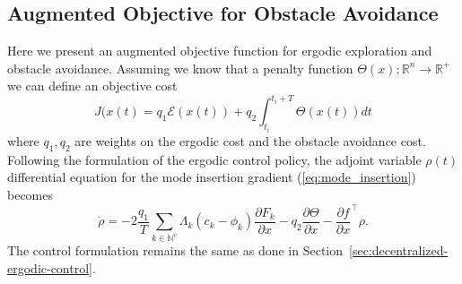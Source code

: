 \documentclass[letterpaper, 10 pt, conference]{ieeeconf}  %
\begin{document}
\subsection{Augmented Objective for Obstacle Avoidance}
\label{sec:obstacle_cost}
Here we present an augmented objective function for ergodic exploration and obstacle avoidance.
Assuming we know that a penalty function $\Theta(x) : \mathbb{R}^n \to \mathbb{R}^+$ we can define an objective cost
\begin{equation}
J(x(t) = q_1\mathcal{E}(x(t)) + q_2\int_{t_i}^{t_i+T} \Theta(x(t)) dt
\end{equation}
where $q_1,q_2$ are weights on the ergodic cost and the obstacle avoidance cost.
Following the formulation of the ergodic control policy, the adjoint variable $\rho(t)$ differential equation for the mode insertion gradient (\ref{eq:mode_insertion}) becomes
\begin{equation}
\dot{\rho} = -2\frac{q_1}{T} \sum_{k \in \mathbb{N}^v} \Lambda_k (c_k - \phi_k) \frac{ \partial F_k}{\partial x} - q_2\frac{\partial \Theta}{\partial x} - \frac{ \partial f}{\partial x}^\top \rho. 
\end{equation}
The control formulation remains the same as done in Section~\ref{sec:decentralized-ergodic-control}.


\balance



\end{document}

